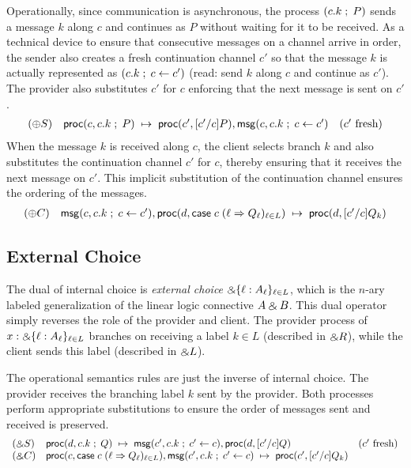 Operationally, since communication is asynchronous, the process
$(c.k \; ; \; P)$ sends a message $k$
along $c$ and continues as $P$ without waiting for it to be received.
As a technical device to ensure that consecutive messages on a
channel arrive in order, the sender also creates a fresh continuation
channel $c'$ so that the message $k$ is actually represented as
$(c.k \; ; \; c \leftarrow c')$ (read: send $k$ along $c$ and
continue as $c'$). The provider also substitutes $c'$ for $c$ enforcing
that the next message is sent on $c'$.
\[
\begin{array}{lll}
(\oplus S) & \mathsf{proc}(c, c.k \; ; \; P) \; \mapsto \; \mathsf{proc}(c', [c'/c]P),
\mathsf{msg}(c, c.k \; ; \; c \leftarrow c') & (c' \text{ fresh})
\end{array}
\]
When the message $k$ is received along $c$, the client selects branch
$k$ and also substitutes the continuation channel $c'$ for $c$, thereby
ensuring that it receives the next message on $c'$. This implicit
substitution of the continuation channel ensures the ordering of the
messages.
\[
\begin{array}{ll}
(\oplus C) & \mathsf{msg}(c, c.k \; ; \; c \leftarrow c'),
\mathsf{proc}(d, \mathsf{case} \; c \; (\ell \Rightarrow Q_\ell)_{\ell \in L}) \; \mapsto \; \mathsf{proc}(d, [c'/c]Q_k)
\end{array}
\]

\subsection*{External Choice}
The dual of internal choice is \emph{external choice} $\mathbin{\binampersand} \{ \ell :
A_\ell \}_{\ell \in L}$, which is the $n$-ary labeled generalization of the
linear logic connective $A \mathbin{\binampersand} B$. This dual operator simply reverses
the role of the provider and client. The provider process of
$x : \mathbin{\binampersand} \{ \ell : A_\ell \}_{\ell \in L}$ branches on receiving a label
$k \in L$ (described in $\mathbin{\binampersand} R$), while the client sends this label
(described in $\mathbin{\binampersand} L$).

The operational semantics rules are just the inverse of internal choice.
The provider receives the branching label $k$ sent by the provider. Both
processes perform appropriate substitutions to ensure the order of messages
sent and received is preserved.
\[
\begin{array}{lll}
(\mathbin{\binampersand} S) & \mathsf{proc}(d, c.k \; ; \; Q) \; \mapsto \; \mathsf{msg}(c', c.k
\; ; \; c' \leftarrow c), \mathsf{proc}(d, [c'/c]Q) & (c' \text{ fresh}) \\
(\mathbin{\binampersand} C) & \mathsf{proc}(c, \mathsf{case} \; c \; (\ell \Rightarrow Q_\ell)_{\ell \in L}),
\mathsf{msg}(c', c.k \; ; \; c' \leftarrow c) \; \mapsto \; \mathsf{proc}(c', [c'/c]Q_k)
\end{array}
\]

